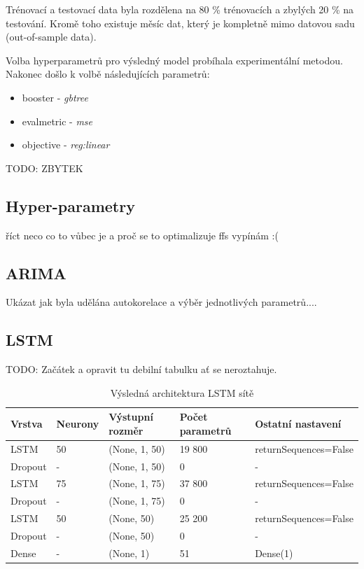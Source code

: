 \documentclass[FM,BP,fonts]{tulthesis}
\begin{document}
Trénovací a testovací data byla rozdělena na 80 \% trénovacích a zbylých 20 \% na testování. Kromě toho existuje měsíc dat, který je kompletně mimo datovou sadu (out-of-sample data). 

Volba hyperparametrů pro výsledný model probíhala experimentální metodou. Nakonec došlo k volbě následujících parametrů:
\begin{itemize}
	\item booster - \textit{gbtree}
	\item evalmetric - \textit{mse}
	\item objective - \textit{reg:linear}
\end{itemize} 

TODO: ZBYTEK


\subsection{Hyper-parametry}
říct neco co to vůbec je a proč se to optimalizuje ffs vypínám :(


\subsection{ARIMA}
Ukázat jak byla udělána autokorelace a výběr jednotlivých parametrů....


\subsection{LSTM}
TODO: Začátek a opravit tu debilní tabulku ať se neroztahuje.
\begin{table}[!ht]
	\centering
	\caption{Výsledná architektura LSTM sítě}
	
	\begin{tabular}{lllll}
		\hline
		\textbf{Vrstva} & \textbf{Neurony} & \textbf{Výstupní rozměr} & \textbf{Počet parametrů} & \textbf{Ostatní nastavení} \\ \hline
		
		LSTM & 50 & (None, 1, 50) & 19 800 & returnSequences=False \\
		Dropout & - & (None, 1, 50) & 0 & - \\
		LSTM  & 75 & (None, 1, 75) & 37 800 & returnSequences=False \\
		Dropout & - & (None, 1, 75) & 0 & - \\
		LSTM   & 50 & (None, 50) & 25 200 & returnSequences=False \\
		Dropout & - & (None, 50) & 0 & - \\
		Dense & - & (None, 1) & 51 & Dense(1) \\
		
		
	\end{tabular}
\end{table}
\end{document}
